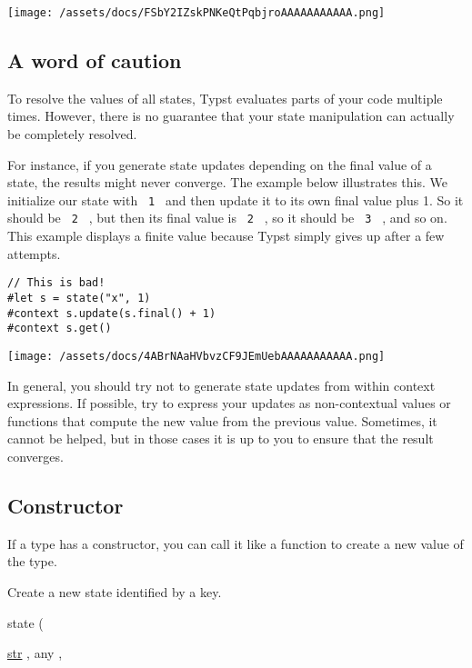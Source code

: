 \texttt{[image: /assets/docs/FSbY2IZskPNKeQtPqbjroAAAAAAAAAAA.png]}

\subsection{A word of caution}\label{caution}

To resolve the values of all states, Typst evaluates parts of your code
multiple times. However, there is no guarantee that your state
manipulation can actually be completely resolved.

For instance, if you generate state updates depending on the final value
of a state, the results might never converge. The example below
illustrates this. We initialize our state with \texttt{\ 1\ } and then
update it to its own final value plus 1. So it should be \texttt{\ 2\ }
, but then its final value is \texttt{\ 2\ } , so it should be
\texttt{\ 3\ } , and so on. This example displays a finite value because
Typst simply gives up after a few attempts.

\begin{verbatim}
// This is bad!
#let s = state("x", 1)
#context s.update(s.final() + 1)
#context s.get()
\end{verbatim}

\texttt{[image: /assets/docs/4ABrNAaHVbvzCF9JEmUebAAAAAAAAAAA.png]}

In general, you should try not to generate state updates from within
context expressions. If possible, try to express your updates as
non-contextual values or functions that compute the new value from the
previous value. Sometimes, it cannot be helped, but in those cases it is
up to you to ensure that the result converges.

\subsection{\texorpdfstring{Constructor
{}}{Constructor }}\label{constructor}

\label{constructor-constructor-tooltip}
If a type has a constructor, you can call it like a function to create a
new value of the type.

Create a new state identified by a key.

{ state } (

{ \href{/docs/reference/foundations/str/}{str} , } { { any } , }

